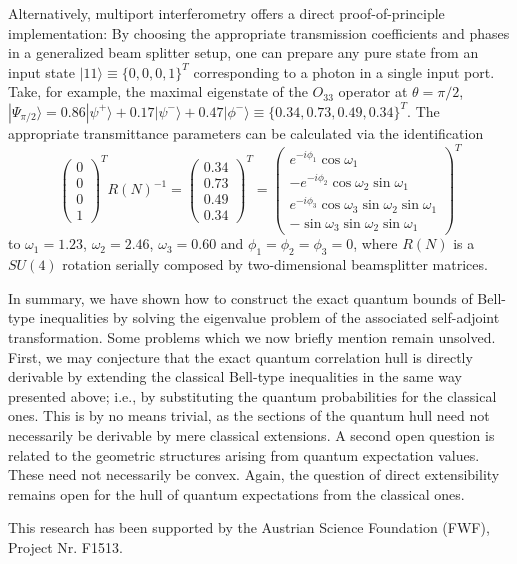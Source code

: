 \documentclass[prl,showpacs,showkeys,amsfonts,amsmath,twocolumn]{revtex4}
\newcommand{\ket}[1]{|#1\rangle}
\begin{document}
Alternatively, multiport interferometry \cite{rzbb,zukowski-97,svozil-2004-analog}
offers a direct proof-of-principle
implementation:
By choosing the appropriate transmission coefficients and phases in a generalized
beam splitter setup, one can prepare any pure state
from an input state $\ket{11} \equiv \{0,0,0,1\}^T$ corresponding to a photon
in a single input port. Take, for example, the maximal eigenstate of
the $O_{33}$ operator at $\theta=\pi/2$, $\ket{\Psi_{\pi/2}}= 0.86
  \ket{\psi^+} + 0.17\ket{\psi^-} + 0.47\ket{\phi^-} \equiv
  \{0.34,0.73,0.49,0.34\}^T$. The appropriate transmittance parameters
  can be calculated via the identification \cite{rzbb}
  \begin{equation}
    \begin{pmatrix}0\\0\\0\\1\end{pmatrix}^T R(N)^{-1} =  \begin{pmatrix}0.34\\0.73\\0.49\\0.34\end{pmatrix}^T =
    \begin{pmatrix}e^{-i\phi_1}\cos\omega_1 \\-e^{-i\phi_2}\cos\omega_2\sin\omega_1\\e^{-i\phi_3}\cos\omega_3\sin\omega_2\sin\omega_1\\-\sin\omega_3\sin\omega_2\sin\omega_1\end{pmatrix}^T
  \end{equation}
to $\omega_1 = 1.23$, $\omega_2=2.46$, $\omega_3=0.60$ and $\phi_1=\phi_2=\phi_3=0$,
where $R(N)$ is a
$SU(4)$ rotation serially composed by two-dimensional beamsplitter
matrices.


In summary, we have shown how to construct the exact quantum bounds of
Bell-type inequalities
by solving the eigenvalue problem of the associated self-adjoint
transformation.
Some problems which we now briefly mention remain unsolved. First, we may conjecture that the exact quantum correlation hull is directly derivable by extending the
classical Bell-type
inequalities in the same way presented above;
i.e., by substituting the quantum probabilities for the classical ones. This is by no means trivial, as the sections of the quantum hull need not necessarily be derivable by mere classical extensions. A second open question is related to the geometric structures arising from quantum expectation values. These need not necessarily be convex. Again, the question of direct extensibility remains open for the hull of
quantum expectations
from the classical ones.

This research has been supported by the Austrian Science Foundation (FWF),
Project Nr. F1513.




\end{document}
